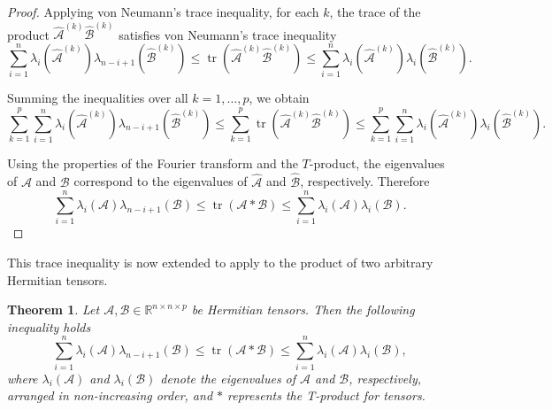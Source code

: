 \documentclass[oupthm]{CUP-JNL-BCM}%
\theoremstyle{oupplain}
\newtheorem{theorem}{Theorem}[section]
\theoremstyle{oupdefinition}
\theoremstyle{oupremark}
\theoremstyle{oupproof}
\newtheorem{proof}{Proof}
\numberwithin{equation}{section}
\begin{document}
\begin{proof}
\noindent Applying von Neumann's trace inequality, for each $k$, the trace of the product $\widehat{\mathcal{A}}^{(k)} \widehat{\mathcal{B}}^{(k)}$ satisfies von Neumann's trace inequality
\[
\sum_{i=1}^n \lambda_i(\widehat{\mathcal{A}}^{(k)}) \lambda_{n-i+1}(\widehat{\mathcal{B}}^{(k)}) \leq \operatorname{tr}(\widehat{\mathcal{A}}^{(k)} \widehat{\mathcal{B}}^{(k)}) \leq \sum_{i=1}^n \lambda_i(\widehat{\mathcal{A}}^{(k)}) \lambda_i(\widehat{\mathcal{B}}^{(k)}).
\]
 
\noindent Summing the inequalities over all $k = 1, \dots, p$, we obtain
\[
\sum_{k=1}^p \sum_{i=1}^n \lambda_i(\widehat{\mathcal{A}}^{(k)}) \lambda_{n-i+1}(\widehat{\mathcal{B}}^{(k)}) \leq \sum_{k=1}^p \operatorname{tr}(\widehat{\mathcal{A}}^{(k)} \widehat{\mathcal{B}}^{(k)}) \leq \sum_{k=1}^p \sum_{i=1}^n \lambda_i(\widehat{\mathcal{A}}^{(k)}) \lambda_i(\widehat{\mathcal{B}}^{(k)}).
\]
 
\noindent Using the properties of the Fourier transform and the $T$-product, the eigenvalues of $\mathcal{A}$ and $\mathcal{B}$ correspond to the eigenvalues of $\widehat{\mathcal{A}}$ and $\widehat{\mathcal{B}}$, respectively. Therefore
\[
\sum_{i=1}^n \lambda_i(\mathcal{A}) \lambda_{n-i+1}(\mathcal{B}) \leq \operatorname{tr}(\mathcal{A} * \mathcal{B}) \leq \sum_{i=1}^n \lambda_i(\mathcal{A}) \lambda_i(\mathcal{B}).
\]
\end{proof}


\noindent This trace inequality is now extended to apply to the product of two arbitrary Hermitian tensors.

\begin{theorem}
    Let $\mathcal{A}, \mathcal{B} \in \mathbb{R}^{n \times n \times p}$ be Hermitian tensors. Then the following inequality holds
    \[
    \sum_{i=1}^n \lambda_i(\mathcal{A}) \lambda_{n-i+1}(\mathcal{B}) \leq \operatorname{tr}(\mathcal{A} * \mathcal{B}) \leq \sum_{i=1}^n \lambda_i(\mathcal{A}) \lambda_i(\mathcal{B}),
    \]
    where $\lambda_i(\mathcal{A})$ and $\lambda_i(\mathcal{B})$ denote the eigenvalues of $\mathcal{A}$ and $\mathcal{B}$, respectively, arranged in non-increasing order, and $*$ represents the T-product for tensors.
\end{theorem}
\end{document}
